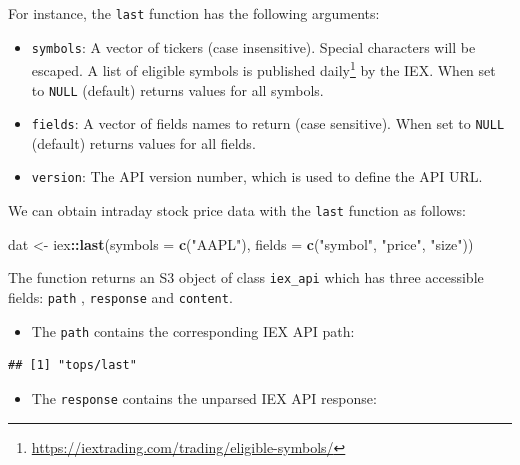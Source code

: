 \documentclass[]{book}
\newenvironment{Shaded}{\begin{snugshade}}{\end{snugshade}}
\newcommand{\KeywordTok}[1]{\textcolor[rgb]{0.13,0.29,0.53}{\textbf{#1}}}
\newcommand{\DataTypeTok}[1]{\textcolor[rgb]{0.13,0.29,0.53}{#1}}
\newcommand{\StringTok}[1]{\textcolor[rgb]{0.31,0.60,0.02}{#1}}
\newcommand{\OperatorTok}[1]{\textcolor[rgb]{0.81,0.36,0.00}{\textbf{#1}}}
\newcommand{\NormalTok}[1]{#1}
\DeclareRobustCommand{\href}[2]{#2\footnote{\url{#1}}}
\providecommand{\tightlist}{%
  \setlength{\itemsep}{0pt}\setlength{\parskip}{0pt}}
\theoremstyle{definition}
\theoremstyle{definition}
\theoremstyle{definition}
\theoremstyle{remark}
\begin{document}
For instance, the \texttt{last} function has the following arguments:

\begin{itemize}
\tightlist
\item
  \texttt{symbols}: A vector of tickers (case insensitive). Special
  characters will be escaped. A list of eligible symbols is
  \href{https://iextrading.com/trading/eligible-symbols/}{published
  daily} by the IEX. When set to \texttt{NULL} (default) returns values
  for all symbols.
\item
  \texttt{fields}: A vector of fields names to return (case sensitive).
  When set to \texttt{NULL} (default) returns values for all fields.
\item
  \texttt{version}: The API version number, which is used to define the
  API URL.
\end{itemize}

We can obtain intraday stock price data with the \texttt{last} function
as follows:

\begin{Shaded}
\begin{Highlighting}[]
\NormalTok{dat <-}\StringTok{ }\NormalTok{iex}\OperatorTok{::}\KeywordTok{last}\NormalTok{(}\DataTypeTok{symbols =} \KeywordTok{c}\NormalTok{(}\StringTok{"AAPL"}\NormalTok{), }\DataTypeTok{fields =} \KeywordTok{c}\NormalTok{(}\StringTok{"symbol"}\NormalTok{, }
  \StringTok{"price"}\NormalTok{, }\StringTok{"size"}\NormalTok{))}
\end{Highlighting}
\end{Shaded}

The function returns an S3 object of class \texttt{iex\_api} which has
three accessible fields: \texttt{path} , \texttt{response} and
\texttt{content}.

\begin{itemize}
\tightlist
\item
  The \texttt{path} contains the corresponding IEX API path:
\end{itemize}

\begin{Shaded}
\end{Shaded}

\begin{verbatim}
## [1] "tops/last"
\end{verbatim}

\begin{itemize}
\tightlist
\item
  The \texttt{response} contains the unparsed IEX API response:
\end{itemize}
\end{document}
